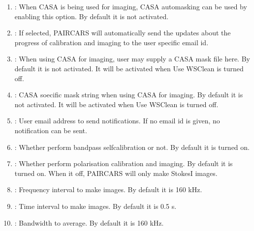 \documentclass[letterpaper,10pt,english]{sphinxmanual}
\begin{document}
\begin{enumerate}
\item {} 
\sphinxAtStartPar
{} : When CASA is being used for imaging, CASA auto\sphinxhyphen{}masking can be used by enabling this option. By default it is not activated.

\item {} 
\sphinxAtStartPar
{} : If selected, P\sphinxhyphen{}AIRCARS will automatically send the updates about the progress of calibration and imaging to the user specific e\sphinxhyphen{}mail id.

\item {} 
\sphinxAtStartPar
{} : When using CASA for imaging, user may supply a CASA mask file here. By default it is not activated. It will be activated when Use WSClean is turned off.

\item {} 
\sphinxAtStartPar
{} : CASA soecific mask string when using CASA for imaging. By default it is not activated.  It will be activated when Use WSClean is turned off.

\item {} 
\sphinxAtStartPar
{} : User e\sphinxhyphen{}mail address to send notifications. If no e\sphinxhyphen{}mail id is given, no notification can be sent.

\item {} 
\sphinxAtStartPar
{} : Whether perform bandpass self\sphinxhyphen{}calibration or not. By default it is turned on.

\item {} 
\sphinxAtStartPar
{} : Whether perform polarisation calibration and imaging. By default it is turned on. When it off, P\sphinxhyphen{}AIRCARS will only make Stokes\sphinxhyphen{}I images.

\item {} 
\sphinxAtStartPar
{} : Frequency interval to make images. By default it is 160 kHz.

\item {} 
\sphinxAtStartPar
{} : Time interval to make images. By default it is 0.5 s.

\item {} 
\sphinxAtStartPar
{} : Bandwidth to average. By default it is 160 kHz.


\end{enumerate}
\end{document}

